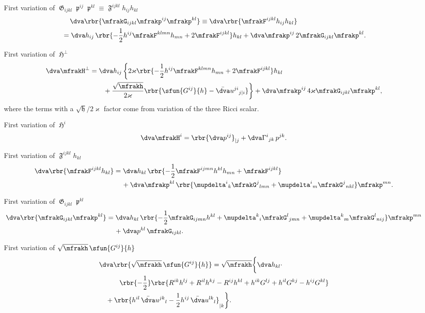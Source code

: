 \documentclass[a4paper,11pt]{article}
\begin{document}
First variation of $\mfrakG_{ijkl}\mfrakp^{ij}\mfrakp^{kl} \equiv
\mfrakF^{ijkl}h_{ij}h_{kl}$
\begin{align}
&\quad\,\dva\rbr{ \mfrakG_{ijkl} \mfrakp^{ij}\mfrakp^{kl}}
\equiv \dva\rbr{\mfrakF^{ijkl}h_{ij}h_{kl}}
\nonumber \\
&=\dva h_{ij}\,\rbr{-\frac{1}{2} h^{ij} \mfrakF^{klmn} h_{mn}
+ 2 \mfrakF^{ijkl} } h_{kl} 
+\dva \mfrakp^{ij}\,2 \mfrakG_{ijkl}\mfrakp^{kl}.
\end{align}

First variation of $\mfrakH^\perp$
\begin{align}
\dva \mfrakH^\perp &= \dva h_{ij}\,\bigg\{
2\varkappa \rbr{ -\frac{1}{2}h^{ij} \mfrakF^{klmn} h_{mn}
+ 2 \mfrakF^{ijkl} } h_{kl}
\nonumber \\
&\qquad
+\frac{\sqrt{\mfrakh}}{2\varkappa}\rbr{\sfun{G^{ij}}{h}
-\bar{\dva}u^{ji}{}_{j|i}} \bigg\}
+\dva \mfrakp^{ij}\,4\varkappa \mfrakG_{ijkl}\mfrakp^{kl},
\end{align}
where the terms with a $\sqrt{\mfrakh}/2\varkappa$ factor come from variation 
of the three Ricci scalar.

First variation of $\mfrakH^i$
\begin{align}
\dva \mfrakH^i = \rbr{\dva p^{ij}}_{|j}
+ \dva\Gamma^{i}{}_{jk}\,p^{jk}.
\end{align}

First variation of $\mfrakF^{ijkl}h_{kl}$
\begin{align}
\dva\rbr{\mfrakF^{ijkl}h_{kl}} &= \dva h_{kl}\,
\rbr{-\frac{1}{2}\mfrakF^{ijmn}h^{kl}h_{mn}+\mfrakF^{ijkl}}
\nonumber \\
&\quad\,
+\dva \mfrakp^{kl}\,\rbr{
\mupdelta^{i}{}_{k}\mfrakG^{j}{}_{lmn} +
\mupdelta^{i}{}_{m}\mfrakG^{j}{}_{nkl}}\mfrakp^{mn}.
\end{align}

First variation of $\mfrakG_{ijkl}\mfrakp^{kl}$
\begin{align}
\dva\rbr{\mfrakG_{ijkl}\mfrakp^{kl}} &= \dva h_{kl}\,
\rbr{-\frac{1}{2}\mfrakG_{ijmn}h^{kl}+
\mupdelta^{k}{}_{i}\mfrakG^{l}{}_{jmn}+
\mupdelta^{k}{}_{m}\mfrakG^{l}{}_{nij}}\mfrakp^{mn}
\nonumber \\
&\quad\,
+\dva p^{kl}\,\mfrakG_{ijkl}.
\end{align}

First variation of $\sqrt{\mfrakh}\,\sfun{G^{ij}}{h}$
\begin{align}
&
\dva\rbr{\sqrt{\mfrakh}\,\sfun{G^{ij}}{h}}
= \sqrt{\mfrakh}\bigg\{\dva h_{kl}\cdot
\nonumber \\
&\qquad\quad
\rbr{-\frac{1}{2}}\rbr{
R^{ik}h^{lj}+R^{il}h^{kj}-R^{ij}h^{kl}+h^{ik}G^{lj}+h^{il}G^{kj}-h^{ij}G^{kl}}
\nonumber \\
&\quad
+\rbr{h^{il}\,\bar{\dva}u^{jk}{}_{l}
- \frac{1}{2}h^{ij}\,\bar{\dva}u^{lk}{}_{l}}_{|k} \bigg\}.
\end{align}
\end{document}
